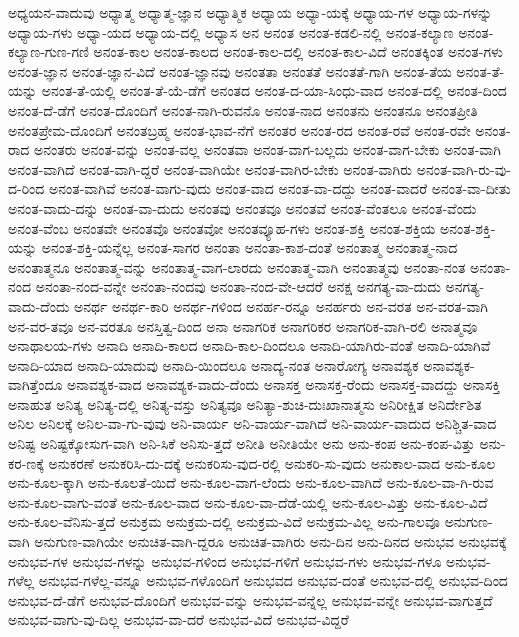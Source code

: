 {ಅಧ್ಯಯನ-ವಾದುವು
ಅಧ್ಯಾತ್ಮ
ಅಧ್ಯಾತ್ಮ-ಜ್ಞಾನ
ಅಧ್ಯಾತ್ಮಿಕ
ಅಧ್ಯಾಯ
ಅಧ್ಯಾ-ಯಕ್ಕೆ
ಅಧ್ಯಾಯ-ಗಳ
ಅಧ್ಯಾಯ-ಗಳನ್ನು
ಅಧ್ಯಾಯ-ಗಳು
ಅಧ್ಯಾ-ಯದ
ಅಧ್ಯಾಯ-ದಲ್ಲಿ
ಅಧ್ಯಾಸ
ಅನ
ಅನಂತ
ಅನಂತ-ಕಡಲಿ-ನಲ್ಲಿ
ಅನಂತ-ಕಲ್ಯಾಣ
ಅನಂತ-ಕಲ್ಯಾಣ-ಗುಣ-ಗಣಿ
ಅನಂತ-ಕಾಲ
ಅನಂತ-ಕಾಲದ
ಅನಂತ-ಕಾಲ-ದಲ್ಲಿ
ಅನಂತ-ಕಾಲ-ವಿದೆ
ಅನಂತಕ್ಕಿಂತ
ಅನಂತ-ಗಳು
ಅನಂತ-ಜ್ಞಾನ
ಅನಂತ-ಜ್ಞಾನ-ವಿದೆ
ಅನಂತ-ಜ್ಞಾನವು
ಅನಂತತಾ
ಅನಂತತೆ
ಅನಂತತೆ-ಗಾಗಿ
ಅನಂತ-ತೆಯ
ಅನಂತ-ತೆ-ಯನ್ನು
ಅನಂತ-ತೆ-ಯಲ್ಲಿ
ಅನಂತ-ತೆ-ಯೆ-ಡೆಗೆ
ಅನಂತದ
ಅನಂತ-ದ-ಯಾ-ಸಿಂಧು-ವಾದ
ಅನಂತ-ದಲ್ಲಿ
ಅನಂತ-ದಿಂದ
ಅನಂತ-ದೆ-ಡೆಗೆ
ಅನಂತ-ದೊಂದಿಗೆ
ಅನಂತ-ನಾಗಿ-ರುವನೊ
ಅನಂತ-ನಾದ
ಅನಂತನು
ಅನಂತನೂ
ಅನಂತಪ್ರೀತಿ
ಅನಂತಪ್ರೇಮ-ದೊಂದಿಗೆ
ಅನಂತಬ್ರಹ್ಮ
ಅನಂತ-ಭಾವ-ನೆಗೆ
ಅನಂತರ
ಅನಂತ-ರದ
ಅನಂತ-ರವೆ
ಅನಂತ-ರವೇ
ಅನಂತ-ರಾದ
ಅನಂತರು
ಅನಂತ-ವನ್ನು
ಅನಂತ-ವಲ್ಲ
ಅನಂತವಾ
ಅನಂತ-ವಾಗ-ಬಲ್ಲದು
ಅನಂತ-ವಾಗ-ಬೇಕು
ಅನಂತ-ವಾಗಿ
ಅನಂತ-ವಾಗಿದೆ
ಅನಂತ-ವಾಗಿ-ದ್ದರೆ
ಅನಂತ-ವಾಗಿಯೇ
ಅನಂತ-ವಾಗಿರ-ಬೇಕು
ಅನಂತ-ವಾಗಿರು
ಅನಂತ-ವಾಗಿ-ರು-ವು-ದ-ರಿಂದ
ಅನಂತ-ವಾಗಿವೆ
ಅನಂತ-ವಾಗು-ವುದು
ಅನಂತ-ವಾದ
ಅನಂತ-ವಾ-ದದ್ದು
ಅನಂತ-ವಾದರೆ
ಅನಂತ-ವಾ-ದೀತು
ಅನಂತ-ವಾದು-ದನ್ನು
ಅನಂತ-ವಾ-ದುದು
ಅನಂತವು
ಅನಂತವೂ
ಅನಂತವೆ
ಅನಂತ-ವೆಂತಲೂ
ಅನಂತ-ವೆಂದು
ಅನಂತ-ವೆಂಬ
ಅನಂತವೇ
ಅನಂತವೊ
ಅನಂತವೋ
ಅನಂತವ್ಯೂಹ-ಗಳು
ಅನಂತ-ಶಕ್ತಿ
ಅನಂತ-ಶಕ್ತಿಯ
ಅನಂತ-ಶಕ್ತಿ-ಯನ್ನು
ಅನಂತ-ಶಕ್ತಿ-ಯನ್ನೆಲ್ಲ
ಅನಂತ-ಸಾಗರ
ಅನಂತಾ
ಅನಂತಾ-ಕಾಶ-ದಂತೆ
ಅನಂತಾತ್ಮ
ಅನಂತಾತ್ಮ-ನಾದ
ಅನಂತಾತ್ಮನೂ
ಅನಂತಾತ್ಮ-ವನ್ನು
ಅನಂತಾತ್ಮ-ವಾಗ-ಲಾರದು
ಅನಂತಾತ್ಮ-ವಾಗಿ
ಅನಂತಾತ್ಮವು
ಅನಂತಾ-ನಂತ
ಅನಂತಾ-ನಂದ
ಅನಂತಾ-ನಂದ-ವನ್ನೇ
ಅನಂತಾ-ನಂದವು
ಅನಂತಾ-ನಂದ-ವೇ-ಆದರೆ
ಅನಕ್ಷ
ಅನಗತ್ಯ-ವಾ-ದುದು
ಅನಗತ್ಯ-ವಾದು-ದೆಂದು
ಅನರ್ಥ
ಅನರ್ಥ-ಕಾರಿ
ಅನರ್ಥ-ಗಳಿಂದ
ಅನರ್ಹ-ರನ್ನೂ
ಅನರ್ಹರು
ಅನ-ವರತ
ಅನ-ವರತ-ವಾಗಿ
ಅನ-ವರ-ತವೂ
ಅನ-ವರತೂ
ಅನಸ್ತಿತ್ವ-ದಿಂದ
ಅನಾ
ಅನಾಗರಿಕ
ಅನಾಗರಿಕರ
ಅನಾಗರಿಕ-ವಾಗಿ-ರಲಿ
ಅನಾತ್ಮವೂ
ಅನಾಥಾಲಯ-ಗಳು
ಅನಾದಿ
ಅನಾದಿ-ಕಾಲದ
ಅನಾದಿ-ಕಾಲ-ದಿಂದಲೂ
ಅನಾದಿ-ಯಾಗಿರು-ವಂತೆ
ಅನಾದಿ-ಯಾಗಿವೆ
ಅನಾದಿ-ಯಾದ
ಅನಾದಿ-ಯಾದುವು
ಅನಾದಿ-ಯಿಂದಲೂ
ಅನಾದ್ಯ-ನಂತ
ಅನಾರೋಗ್ಯ
ಅನಾವಶ್ಯಕ
ಅನಾವಶ್ಯಕ-ವಾಗಿತ್ತೆಂದೂ
ಅನಾವಶ್ಯಕ-ವಾದ
ಅನಾವಶ್ಯಕ-ವಾದು-ದೆಂದು
ಅನಾಸಕ್ತ
ಅನಾಸಕ್ತ-ರೆಂದು
ಅನಾಸಕ್ತ-ವಾದದ್ದು
ಅನಾಸಕ್ತಿ
ಅನಾಹುತ
ಅನಿತ್ಯ
ಅನಿತ್ಯ-ದಲ್ಲಿ
ಅನಿತ್ಯ-ವಸ್ತು
ಅನಿತ್ಯವೂ
ಅನಿತ್ಯಾ-ಶುಚಿ-ದುಃಖಾನಾತ್ಮಸು
ಅನಿರೀಕ್ಷಿತ
ಅನಿರ್ದೇಶಿತ
ಅನಿಲ
ಅನಿಲಕ್ಕೆ
ಅನಿಲ-ವಾ-ಗು-ವುವು
ಅನಿ-ವಾರ್ಯ
ಅನಿ-ವಾರ್ಯ-ವಾಗಿದೆ
ಅನಿ-ವಾರ್ಯ-ವಾದುದ
ಅನಿಶ್ಚಿತ-ವಾದ
ಅನಿಷ್ಟ
ಅನಿಷ್ಟಕ್ಕೋಸುಗ-ವಾಗಿ
ಅನಿ-ಸಿಕೆ
ಅನಿಸು-ತ್ತದೆ
ಅನೀತಿ
ಅನೀತಿಯೇ
ಅನು
ಅನು-ಕಂಪ
ಅನು-ಕಂಪ-ವಿತ್ತು
ಅನು-ಕರ-ಣಕ್ಕೆ
ಅನುಕರಣೆ
ಅನುಕರಿಸಿ-ದು-ದಕ್ಕೆ
ಅನುಕರಿಸು-ವುದ-ರಲ್ಲಿ
ಅನುಕರಿ-ಸು-ವುದು
ಅನುಕಾಲ-ವಾದ
ಅನು-ಕೂಲ
ಅನು-ಕೂಲ-ಕ್ಕಾಗಿ
ಅನು-ಕೂಲತೆ-ಯಿದೆ
ಅನು-ಕೂಲ-ವಾಗ-ಲೆಂದು
ಅನು-ಕೂಲ-ವಾಗಿದೆ
ಅನು-ಕೂಲ-ವಾ-ಗಿ-ರುವ
ಅನು-ಕೂಲ-ವಾಗು-ವಂತೆ
ಅನು-ಕೂಲ-ವಾದ
ಅನು-ಕೂಲ-ವಾ-ದೆಡೆ-ಯಲ್ಲಿ
ಅನು-ಕೂಲ-ವಿತ್ತು
ಅನು-ಕೂಲ-ವಿದೆ
ಅನು-ಕೂಲ-ವೆನಿಸು-ತ್ತದೆ
ಅನುಕ್ರಮ
ಅನುಕ್ರಮ-ದಲ್ಲಿ
ಅನುಕ್ರಮ-ವಿದೆ
ಅನುಕ್ರಮ-ವಿಲ್ಲ
ಅನು-ಗಾಲವೂ
ಅನುಗುಣ-ವಾಗಿ
ಅನುಗುಣ-ವಾಗಿಯೇ
ಅನುಚಿತ-ವಾಗಿ-ದ್ದರೂ
ಅನುಚಿತ-ವಾಗಿರು
ಅನು-ದಿನ
ಅನು-ದಿನದ
ಅನುಭವ
ಅನುಭವಕ್ಕೆ
ಅನುಭವ-ಗಳ
ಅನುಭವ-ಗಳನ್ನು
ಅನುಭವ-ಗಳಿಂದ
ಅನುಭವ-ಗಳಿಗೆ
ಅನುಭವ-ಗಳು
ಅನುಭವ-ಗಳೂ
ಅನುಭವ-ಗಳೆಲ್ಲ
ಅನುಭವ-ಗಳೆಲ್ಲ-ವನ್ನೂ
ಅನುಭವ-ಗಳೊಂದಿಗೆ
ಅನುಭವದ
ಅನುಭವ-ದಂತೆ
ಅನುಭವ-ದಲ್ಲಿ
ಅನುಭವ-ದಿಂದ
ಅನುಭವ-ದೆ-ಡೆಗೆ
ಅನುಭವ-ದೊಂದಿಗೆ
ಅನುಭವ-ವನ್ನು
ಅನುಭವ-ವನ್ನೆಲ್ಲ
ಅನುಭವ-ವನ್ನೇ
ಅನುಭವ-ವಾಗುತ್ತದೆ
ಅನುಭವ-ವಾಗು-ವು-ದಿಲ್ಲ
ಅನುಭವ-ವಾ-ದರೆ
ಅನುಭವ-ವಿದೆ
ಅನುಭವ-ವಿದ್ದರೆ
}
